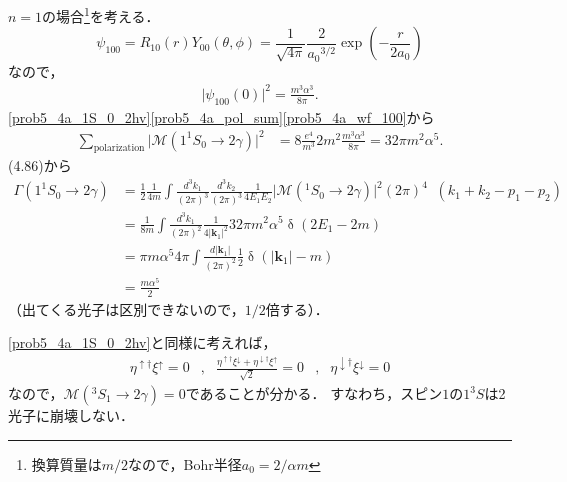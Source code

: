 $n=1$の場合\footnote{換算質量は$m/2$なので，Bohr半径$a_0 = 2/\alpha m$}を考える．
\[ \psi_{100} = R_{10}(r) Y_{00}(\theta, \phi) = \frac{1}{\sqrt{4\pi}} \frac{2}{a_0{}^{3/2}} \exp \left( - \frac{r}{2a_0} \right) \]
なので，
\begin{align}
  \lvert \psi_{100}(0) \rvert^2 = \frac{m^3\alpha^3}{8\pi} . \label{prob5_4a_wf_100}
\end{align}
\eqref{prob5_4a_1S_0_2hv}\eqref{prob5_4a_pol_sum}\eqref{prob5_4a_wf_100}から
\begin{align}
  \sum_\text{polarization} \lvert \mathcal{M}(1^1S_0 \to 2\gamma) \rvert^2 &= 8 \frac{e^4}{m^3} 2m^2 \frac{m^3\alpha^3}{8\pi} = 32\pi m^2 \alpha^5 .
\end{align}
(4.86)から
\begin{align*}
  \Gamma(1^1S_0 \to 2\gamma) &= \frac{1}{2} \frac{1}{4m} \int \frac{d^3k_1}{(2\pi)^3}\frac{d^3k_2}{(2\pi)^3} \frac{1}{4E_1E_2} \lvert \mathcal{M}(^1S_0 \to 2\gamma) \rvert^2 (2\pi)^4 \mathop{\delta^{(4)}}(k_1+k_2-p_1-p_2) \\
  &= \frac{1}{8m} \int \frac{d^3k_1}{(2\pi)^2} \frac{1}{4\lvert \boldsymbol{k}_1 \rvert^2} 32\pi m^2 \alpha^5 \mathop\delta(2E_1 - 2m) \\
  &= \pi m\alpha^5 4\pi \int \frac{d\lvert \boldsymbol{k}_1 \rvert}{(2\pi)^2} \frac{1}{2} \mathop\delta(\lvert \boldsymbol{k}_1 \rvert - m) \\
  &= \frac{m\alpha^5}{2}
\end{align*}
（出てくる光子は区別できないので，$1/2$倍する）．

\eqref{prob5_4a_1S_0_2hv}と同様に考えれば，
\begin{align*}
  \eta^{\uparrow\dagger}\xi^\uparrow = 0
  & , &
  \frac{\eta^{\uparrow\dagger}\xi^\downarrow + \eta^{\downarrow\dagger}\xi^\uparrow}{\sqrt{2}} = 0
  & , &
  \eta^{\downarrow\dagger}\xi^\downarrow = 0
\end{align*}
なので，$\mathcal{M}(^3S_1 \to 2\gamma) = 0$であることが分かる．
すなわち，スピン$1$の$1^3S$は2光子に崩壊しない．


